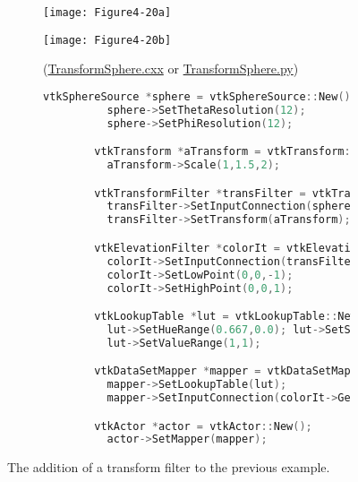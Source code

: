 \begin{figure}[htb]
	\begin{subfigure}[h]{0.48\linewidth}
		\texttt{[image: Figure4-20a]}
		\caption*{}
		\label{fig:Figure4-20a}
	\end{subfigure}
	\hfill
	\begin{subfigure}[h]{0.48\linewidth}
		\texttt{[image: Figure4-20b]}
		\caption*{(\href{https://lorensen.github.io/VTKExamples/site/Cxx/Rendering/TransformSphere/}{TransformSphere.cxx} or \href{https://lorensen.github.io/VTKExamples/site/Python/Rendering/TransformSphere/}{TransformSphere.py})}
		\label{fig:Figure4-20b}
	\end{subfigure}
	\hfill
	\begin{subfigure}[h]{0.96\linewidth}
		\caption*{}
	\end{subfigure}
	\hfill
	\begin{subfigure}[h]{0.96\linewidth}
		\begin{lstlisting}[language=C++, caption={Warped Sphere.}]
		vtkSphereSource *sphere = vtkSphereSource::New();
		  sphere->SetThetaResolution(12);
		  sphere->SetPhiResolution(12);

		vtkTransform *aTransform = vtkTransform::New();
		  aTransform->Scale(1,1.5,2);

		vtkTransformFilter *transFilter = vtkTransformFilter::New();
		  transFilter->SetInputConnection(sphere->GetOutputPort());
		  transFilter->SetTransform(aTransform);

		vtkElevationFilter *colorIt = vtkElevationFilter::New();
		  colorIt->SetInputConnection(transFilter->GetOutputPort());
		  colorIt->SetLowPoint(0,0,-1);
		  colorIt->SetHighPoint(0,0,1);

		vtkLookupTable *lut = vtkLookupTable::New();
		  lut->SetHueRange(0.667,0.0); lut->SetSaturationRange(1,1);
		  lut->SetValueRange(1,1);

		vtkDataSetMapper *mapper = vtkDataSetMapper::New();
		  mapper->SetLookupTable(lut);
		  mapper->SetInputConnection(colorIt->GetOutputPort());

		vtkActor *actor = vtkActor::New();
		  actor->SetMapper(mapper);
		\end{lstlisting}
		\caption*{}
		\label{fig:Figure4-20c}
	\end{subfigure}
	\caption{The addition of a transform filter to the previous
		example.}\label{fig:Figure4-20}
\end{figure}
